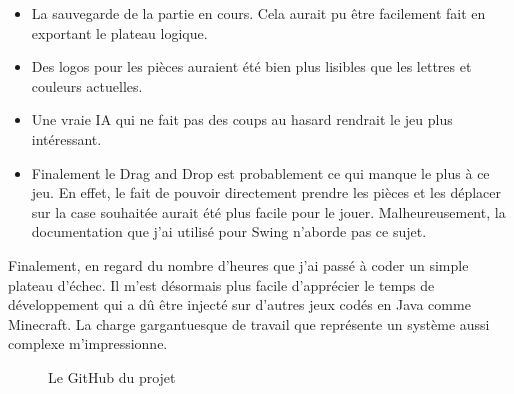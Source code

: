 \documentclass[titlepage]{report}
\begin{document}
\begin{itemize}[label=$\bullet$]
    \setlength\itemsep{1em}
    \item La sauvegarde de la partie en cours. Cela aurait pu être facilement fait en exportant le plateau logique. 
    \item Des logos pour les pièces auraient été bien plus lisibles que les lettres et couleurs actuelles. 
    \item Une vraie IA qui ne fait pas des coups au hasard rendrait le jeu plus intéressant. 
    \item Finalement le Drag and Drop est probablement ce qui manque le plus à ce jeu. En effet, le fait de pouvoir directement prendre les pièces et les déplacer sur la case souhaitée aurait été plus facile pour le jouer. Malheureusement, la documentation que j’ai utilisé pour Swing n’aborde pas ce sujet. 
\end{itemize}
Finalement, en regard du nombre d’heures que j’ai passé à coder un simple plateau d’échec. Il m’est désormais plus facile d’apprécier le temps de développement qui a dû être injecté sur d’autres jeux codés en Java comme Minecraft. La charge gargantuesque de travail que représente un système aussi complexe m’impressionne. 

\begin{figure}[h]
    \centering
    \caption{Le GitHub du projet}
  \end{figure}
\end{document}
